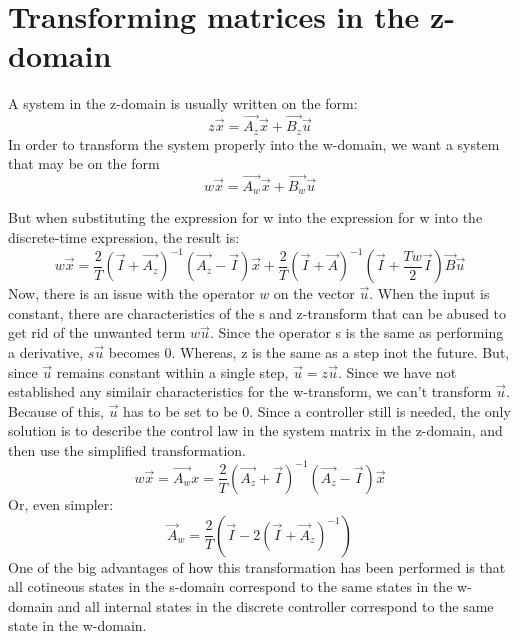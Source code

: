 \section{Transforming matrices in the z-domain}
\label{sec:Transforming_from_z_to_w}
A system in the z-domain is usually written on the form: 
\begin{equation}
 z \Vec{x}= \Vec{A_z}\Vec{x}+ \Vec{B_z}\Vec{u}
\end{equation}
In order to transform the system properly into the w-domain, we want a system that may be on the form
\begin{equation}
 w \Vec{x}= \Vec{A_w}\Vec{x}+ \Vec{B_w}\Vec{u}
\end{equation}

But when substituting the expression for w into the expression for w into the discrete-time expression, the result is: 
\begin{equation}
 w\Vec{x} = \frac{2}{T} \left(\Vec{I} +\Vec{A_z} \right)^{-1}\left(\Vec{A_z}-\Vec{I}\right)\Vec{x} + \frac{2}{T}\left(\Vec{I}+\Vec{A}\right)^{-1}\left(\Vec{I} +\frac{Tw}{2}\Vec{I}\right)\Vec{B}\Vec{u}
\end{equation}
Now, there is an issue with the operator $w$ on the vector $\Vec{u}$. When the input is constant, there are characteristics of the s and z-transform that can be abused to get rid of the unwanted term $w\Vec{u}$. Since the operator s is the same as performing a derivative, $s\Vec{u}$ becomes 0. Whereas, z is the same as a step inot the future. But, since $\Vec{u}$ remains constant within a single step, $\Vec{u}=z\Vec{u}$. Since we have not established any similair characteristics for the w-transform, we can't transform $\Vec{u}$. Because of this, $\Vec{u}$ has to be set to be 0. Since a controller still is needed, the only solution is to describe the control law in the system matrix in the z-domain, and then use the simplified transformation. 
\begin{equation}
 w\Vec{x} = \Vec{A_w}x = \frac{2}{T} \left(\Vec{A_z} + \Vec{I}\right)^{-1}\left(\Vec{A_z}-\Vec{I}\right)\Vec{x}
\end{equation}
Or, even simpler: 
\begin{equation}
 \Vec{A}_w = \frac{2}{T} \left(\Vec{I} - 2( \Vec{I}+\Vec{A}_z)^{-1}\right)
\end{equation}{}
One of the big advantages of how this transformation has been performed is that all cotineous states in the s-domain correspond to the same states in the w-domain and all internal states in the discrete controller correspond to the same state in the w-domain. 

